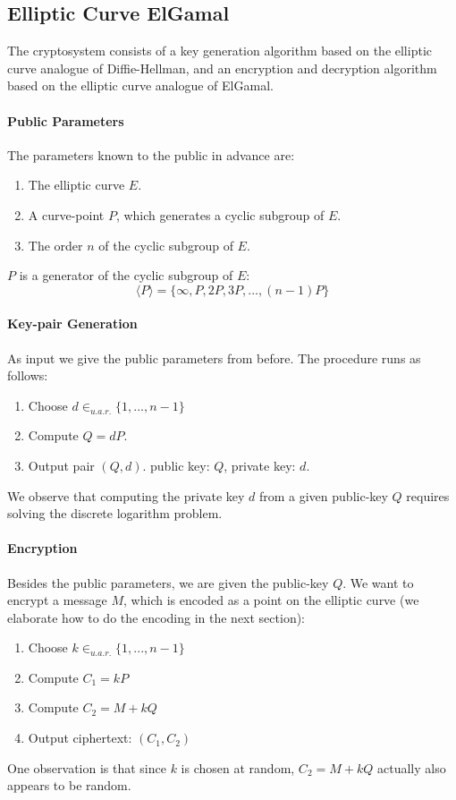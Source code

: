 \documentclass[11pt,english]{article}
\begin{document}
\subsection{Elliptic Curve ElGamal}
\label{Elliptic Curve ElGamal}
The cryptosystem consists of a key generation algorithm based on the elliptic curve analogue of Diffie-Hellman, and an encryption and decryption algorithm based on the elliptic curve analogue of ElGamal.

\paragraph{Public Parameters} The parameters known to the public in advance are:
\begin{enumerate}
 \item The elliptic curve $E$.
 \item A curve-point $P$, which generates a cyclic subgroup of $E$.
 \item The order $n$ of the cyclic subgroup of $E$.
\end{enumerate}
$P$ is a generator of the cyclic subgroup of $E$:
\begin{displaymath}
 \langle P\rangle=\{\infty,P,2P,3P,...,(n-1)P\}
\end{displaymath}


\paragraph{Key-pair Generation}
As input we give the public parameters from before. The procedure runs as follows:
\begin{enumerate}
 \item Choose $d\in_{u.a.r.}\{1,...,n-1\}$
 \item Compute $Q=dP$.
 \item Output pair $(Q,d)$. public key: $Q$, private key: $d$.
\end{enumerate}
We observe that computing the private key $d$ from a given public-key $Q$ requires solving the discrete logarithm problem.

\paragraph{Encryption}
Besides the public parameters, we are given the public-key $Q$. We want to encrypt a message $M$, which is encoded as a point on the elliptic curve (we elaborate how to do the encoding in the next section):
\begin{enumerate}
\item Choose $k\in_{u.a.r.}\{1,...,n-1\}$
\item Compute $C_1=kP$
\item Compute $C_2=M+kQ$
\item Output ciphertext: $(C_1,C_2)$
\end{enumerate}
One observation is that since $k$ is chosen at random, $C_2=M+kQ$ actually also appears to be random.
\end{document}

